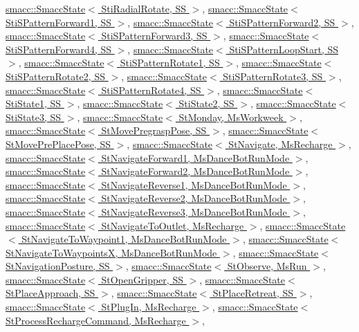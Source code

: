\hyperlink{classsmacc_1_1SmaccState}{smacc\+::\+Smacc\+State$<$ Sti\+Radial\+Rotate, S\+S $>$}, \hyperlink{classsmacc_1_1SmaccState}{smacc\+::\+Smacc\+State$<$ Sti\+S\+Pattern\+Forward1, S\+S $>$}, \hyperlink{classsmacc_1_1SmaccState}{smacc\+::\+Smacc\+State$<$ Sti\+S\+Pattern\+Forward2, S\+S $>$}, \hyperlink{classsmacc_1_1SmaccState}{smacc\+::\+Smacc\+State$<$ Sti\+S\+Pattern\+Forward3, S\+S $>$}, \hyperlink{classsmacc_1_1SmaccState}{smacc\+::\+Smacc\+State$<$ Sti\+S\+Pattern\+Forward4, S\+S $>$}, \hyperlink{classsmacc_1_1SmaccState}{smacc\+::\+Smacc\+State$<$ Sti\+S\+Pattern\+Loop\+Start, S\+S $>$}, \hyperlink{classsmacc_1_1SmaccState}{smacc\+::\+Smacc\+State$<$ Sti\+S\+Pattern\+Rotate1, S\+S $>$}, \hyperlink{classsmacc_1_1SmaccState}{smacc\+::\+Smacc\+State$<$ Sti\+S\+Pattern\+Rotate2, S\+S $>$}, \hyperlink{classsmacc_1_1SmaccState}{smacc\+::\+Smacc\+State$<$ Sti\+S\+Pattern\+Rotate3, S\+S $>$}, \hyperlink{classsmacc_1_1SmaccState}{smacc\+::\+Smacc\+State$<$ Sti\+S\+Pattern\+Rotate4, S\+S $>$}, \hyperlink{classsmacc_1_1SmaccState}{smacc\+::\+Smacc\+State$<$ Sti\+State1, S\+S $>$}, \hyperlink{classsmacc_1_1SmaccState}{smacc\+::\+Smacc\+State$<$ Sti\+State2, S\+S $>$}, \hyperlink{classsmacc_1_1SmaccState}{smacc\+::\+Smacc\+State$<$ Sti\+State3, S\+S $>$}, \hyperlink{classsmacc_1_1SmaccState}{smacc\+::\+Smacc\+State$<$ St\+Monday, Ms\+Workweek $>$}, \hyperlink{classsmacc_1_1SmaccState}{smacc\+::\+Smacc\+State$<$ St\+Move\+Pregrasp\+Pose, S\+S $>$}, \hyperlink{classsmacc_1_1SmaccState}{smacc\+::\+Smacc\+State$<$ St\+Move\+Pre\+Place\+Pose, S\+S $>$}, \hyperlink{classsmacc_1_1SmaccState}{smacc\+::\+Smacc\+State$<$ St\+Navigate, Ms\+Recharge $>$}, \hyperlink{classsmacc_1_1SmaccState}{smacc\+::\+Smacc\+State$<$ St\+Navigate\+Forward1, Ms\+Dance\+Bot\+Run\+Mode $>$}, \hyperlink{classsmacc_1_1SmaccState}{smacc\+::\+Smacc\+State$<$ St\+Navigate\+Forward2, Ms\+Dance\+Bot\+Run\+Mode $>$}, \hyperlink{classsmacc_1_1SmaccState}{smacc\+::\+Smacc\+State$<$ St\+Navigate\+Reverse1, Ms\+Dance\+Bot\+Run\+Mode $>$}, \hyperlink{classsmacc_1_1SmaccState}{smacc\+::\+Smacc\+State$<$ St\+Navigate\+Reverse2, Ms\+Dance\+Bot\+Run\+Mode $>$}, \hyperlink{classsmacc_1_1SmaccState}{smacc\+::\+Smacc\+State$<$ St\+Navigate\+Reverse3, Ms\+Dance\+Bot\+Run\+Mode $>$}, \hyperlink{classsmacc_1_1SmaccState}{smacc\+::\+Smacc\+State$<$ St\+Navigate\+To\+Outlet, Ms\+Recharge $>$}, \hyperlink{classsmacc_1_1SmaccState}{smacc\+::\+Smacc\+State$<$ St\+Navigate\+To\+Waypoint1, Ms\+Dance\+Bot\+Run\+Mode $>$}, \hyperlink{classsmacc_1_1SmaccState}{smacc\+::\+Smacc\+State$<$ St\+Navigate\+To\+Waypoints\+X, Ms\+Dance\+Bot\+Run\+Mode $>$}, \hyperlink{classsmacc_1_1SmaccState}{smacc\+::\+Smacc\+State$<$ St\+Navigation\+Posture, S\+S $>$}, \hyperlink{classsmacc_1_1SmaccState}{smacc\+::\+Smacc\+State$<$ St\+Observe, Ms\+Run $>$}, \hyperlink{classsmacc_1_1SmaccState}{smacc\+::\+Smacc\+State$<$ St\+Open\+Gripper, S\+S $>$}, \hyperlink{classsmacc_1_1SmaccState}{smacc\+::\+Smacc\+State$<$ St\+Place\+Approach, S\+S $>$}, \hyperlink{classsmacc_1_1SmaccState}{smacc\+::\+Smacc\+State$<$ St\+Place\+Retreat, S\+S $>$}, \hyperlink{classsmacc_1_1SmaccState}{smacc\+::\+Smacc\+State$<$ St\+Plug\+In, Ms\+Recharge $>$}, \hyperlink{classsmacc_1_1SmaccState}{smacc\+::\+Smacc\+State$<$ St\+Process\+Recharge\+Command, Ms\+Recharge $>$}, 